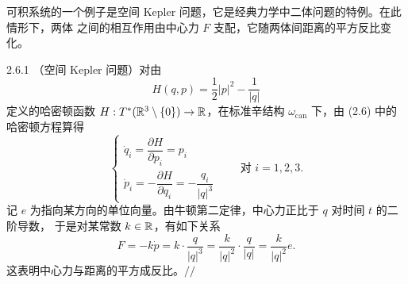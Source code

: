 可积系统的一个例子是空间 Kepler 问题，它是经典力学中二体问题的特例。在此情形下，两体
之间的相互作用由中心力 $F$ 支配，它随两体间距离的平方反比变化。

\begin{wexam}{2.6.1}
（空间 Kepler 问题）对由
\begin{equation}
  H(q,p)=\frac12|p|^2-\frac{1}{|q|}
  \tag{2.31}
\end{equation}
定义的哈密顿函数 $H:T^*(\mathbb{R}^3\setminus\{0\})\to\mathbb{R}$，在标准辛结构
$\omega_{\mathrm{can}}$ 下，由 (2.6) 中的哈密顿方程算得
\[
  \begin{cases}
    \dot q_i=\dfrac{\partial H}{\partial p_i}=p_i\\[2mm]
    \dot p_i=-\dfrac{\partial H}{\partial q_i}=-\dfrac{q_i}{|q|^3}
  \end{cases}
  \qquad\text{对 } i=1,2,3 .
\]
记 $e$ 为指向某方向的单位向量。由牛顿第二定律，中心力正比于 $q$ 对时间 $t$ 的二阶导数，
于是对某常数 $k\in\mathbb{R}$，有如下关系
\[
  F=-k\dot p=k\cdot\frac{q}{|q|^3}=\frac{k}{|q|^2}\cdot\frac{q}{|q|}
  =\frac{k}{|q|^2}e .
\]
这表明中心力与距离的平方成反比。\hfill$//$
\end{wexam}

